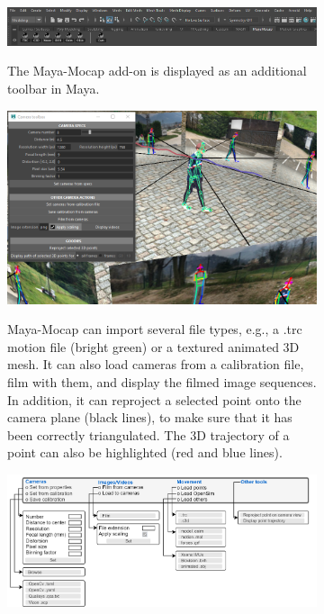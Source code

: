 \clearpage

\begin{figure}[hbtp]
	\centering
	\begin{subfigure}[b]{1\textwidth}
		\centering
		\def\svgwidth{\columnwidth}
		\fontsize{10pt}{10pt}\selectfont
		\href{https://github.com/davidpagnon/Maya-Mocap}{
                  \includegraphics[width=\linewidth]{"../Chap3/Figures/MayaMocap1.png"}
            }
            \caption{The Maya-Mocap add-on is displayed as an additional toolbar in Maya.}
      \end{subfigure}
	\qquad
	\begin{subfigure}[b]{1\textwidth}
		\centering
		\def\svgwidth{\columnwidth}
		\fontsize{10pt}{10pt}\selectfont
		\href{https://github.com/davidpagnon/Maya-Mocap}{
                  \includegraphics[width=\linewidth]{"../Chap3/Figures/MayaMocap2.png"}
            }
            \caption{Maya-Mocap can import several file types, e.g., a .trc motion file (bright green) or a textured animated 3D mesh. It can also load cameras from a calibration file, film with them, and display the filmed image sequences. In addition, it can reproject a selected point onto the camera plane (black lines), to make sure that it has been correctly triangulated. The 3D trajectory of a point can also be highlighted (red and blue lines).}
      \end{subfigure}
      \begin{subfigure}[b]{1\textwidth}
		\centering
		\def\svgwidth{\columnwidth}
		\fontsize{10pt}{10pt}\selectfont
            \includegraphics[width=\linewidth]{"../Chap3/Figures/MayaMocap3.png"}

\end{subfigure}
\end{figure}
